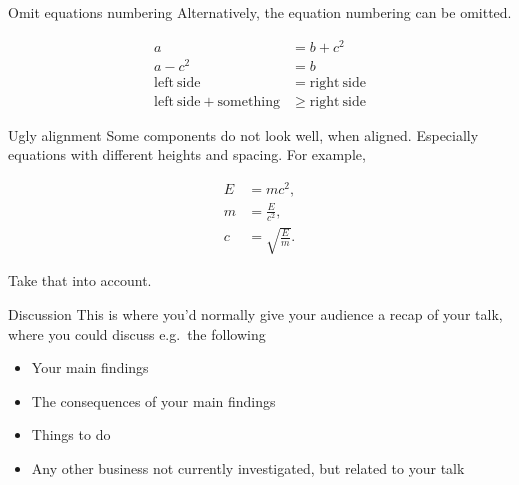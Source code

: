 \documentclass[
  9pt,
  ignorenonframetext,
]{beamer}
\providecommand{\tightlist}{%
  \setlength{\itemsep}{0pt}\setlength{\parskip}{0pt}}
\begin{document}
\begin{frame}{Omit equations numbering}
\protect\hypertarget{omit-equations-numbering}{}
Alternatively, the equation numbering can be omitted.

\begin{align*}
a &= b + c^2\\
a- c^2 &= b \\
\mathrm{left \ side} &= \mathrm{right \ side} \\
\mathrm{left \ side} + \mathrm{something} &\geq \mathrm{right \ side}
\end{align*}
\end{frame}

\begin{frame}{Ugly alignment}
\protect\hypertarget{ugly-alignment}{}
Some components do not look well, when aligned. Especially equations
with different heights and spacing. For example,

\begin{align}
E &= mc^2,\\
m &= \frac{E}{c^2},\\
c &= \sqrt{\frac{E}{m}}.
\end{align}

Take that into account.
\end{frame}

\begin{frame}{Discussion}
\protect\hypertarget{discussion}{}
This is where you'd normally give your audience a recap of your talk,
where you could discuss e.g.~the following

\begin{itemize}
\tightlist
\item
  Your main findings
\item
  The consequences of your main findings
\item
  Things to do
\item
  Any other business not currently investigated, but related to your
  talk
\end{itemize}
\end{frame}
\end{document}
